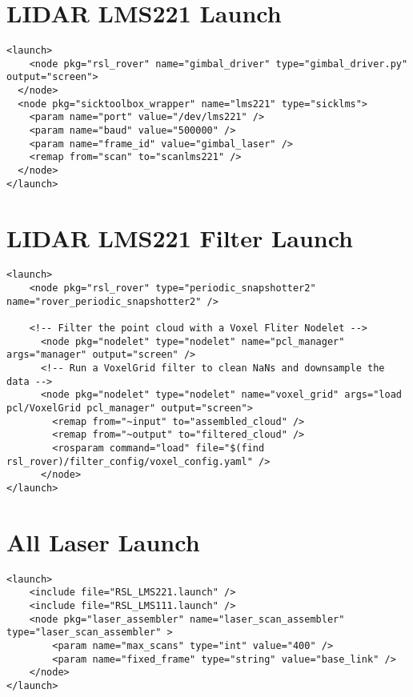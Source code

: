 \section{LIDAR LMS221 Launch}
\begin{verbatim}
<launch>
	<node pkg="rsl_rover" name="gimbal_driver" type="gimbal_driver.py" output="screen">
  </node>
  <node pkg="sicktoolbox_wrapper" name="lms221" type="sicklms">
	<param name="port" value="/dev/lms221" />
	<param name="baud" value="500000" />
	<param name="frame_id" value="gimbal_laser" />
	<remap from="scan" to="scanlms221" /> 
  </node>
</launch>
\end{verbatim}

\section{LIDAR LMS221 Filter Launch}
\begin{verbatim}
<launch>
	<node pkg="rsl_rover" type="periodic_snapshotter2" name="rover_periodic_snapshotter2" />

	<!-- Filter the point cloud with a Voxel Fliter Nodelet -->
	  <node pkg="nodelet" type="nodelet" name="pcl_manager" args="manager" output="screen" />
	  <!-- Run a VoxelGrid filter to clean NaNs and downsample the data -->
	  <node pkg="nodelet" type="nodelet" name="voxel_grid" args="load pcl/VoxelGrid pcl_manager" output="screen">
		<remap from="~input" to="assembled_cloud" />
		<remap from="~output" to="filtered_cloud" />
		<rosparam command="load" file="$(find rsl_rover)/filter_config/voxel_config.yaml" />
	  </node>
</launch>
\end{verbatim}


\section{All Laser Launch}
\begin{verbatim}
<launch>
	<include file="RSL_LMS221.launch" />
	<include file="RSL_LMS111.launch" />
	<node pkg="laser_assembler" name="laser_scan_assembler" type="laser_scan_assembler" >
		<param name="max_scans" type="int" value="400" />
		<param name="fixed_frame" type="string" value="base_link" />
	</node>
</launch>
\end{verbatim}


